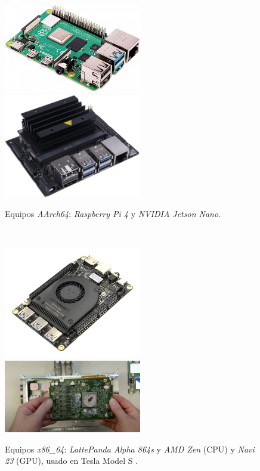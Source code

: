\begin{figure} [h!]
	\begin{center}
		\includegraphics[width=6cm]{figs/raspberrypi}\hspace{0.5cm}\includegraphics[width=6cm]{figs/jetsonnano}
	\end{center}
	\caption{Equipos \textit{AArch64}: \textit{Raspberry Pi 4} y \textit{NVIDIA Jetson Nano}.}
	\label{fig:aarch64}
\end{figure}\

\begin{figure} [h!]
	\begin{center}
		\includegraphics[width=6cm]{figs/lattepanda}\hspace{0.5cm}\includegraphics[width=6cm]{figs/teslazenrdna2}
	\end{center}
	\caption{Equipos \textit{x86\_64}: \textit{LattePanda Alpha 864s} y \textit{AMD Zen} (CPU) y \textit{Navi 23} (GPU), usado en Tesla Model S \cite{teslazenrdna2}.}
	\label{fig:x86}
\end{figure}\

